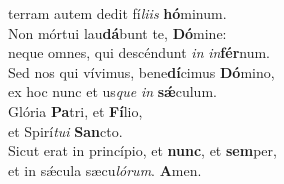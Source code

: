 \oddverse terram autem dedit fí\textit{li}\textit{is} \textbf{hó}minum.\\
\evenverse Non mórtui lau\textbf{dá}bunt te, \textbf{Dó}mine:~\*\\
\evenverse neque omnes, qui descéndunt \textit{in} \textit{in}\textbf{fér}num.\\
\oddverse Sed nos qui vívimus, bene\textbf{dí}cimus \textbf{Dó}mino,~\*\\
\oddverse ex hoc nunc et us\textit{que} \textit{in} \textbf{sǽ}culum.\\
\evenverse Glória \textbf{Pa}tri, et \textbf{Fí}lio,~\*\\
\evenverse et Spirí\textit{tu}\textit{i} \textbf{San}cto.\\
\oddverse Sicut erat in princípio, et \textbf{nunc}, et \textbf{sem}per,~\*\\
\oddverse et in sǽcula sæcu\textit{ló}\textit{rum}. \textbf{A}men.\\
